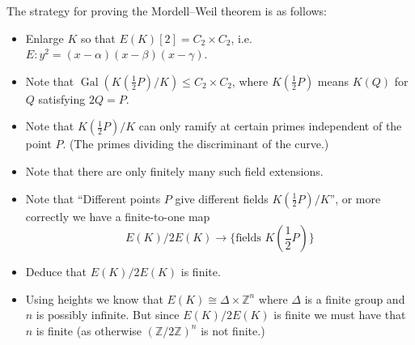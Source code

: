 \documentclass[a4paper]{article}
\theoremstyle{definition}
\DeclareMathOperator{\Gal}{Gal}
\newcommand{\Z}{\mathbb{Z}}
\begin{document}
The strategy for proving the Mordell--Weil theorem is as follows:
\begin{itemize}
    \item Enlarge $K$ so that $E(K)[2]=C_2\times C_2$, i.e.
        $E:y^2=(x-\alpha)(x-\beta)(x-\gamma)$.

    \item Note that $\Gal(K(\frac{1}{2}P)/K)\le C_2\times C_2$, where
        $K(\frac{1}{2}P)$ means $K(Q)$ for $Q$ satisfying $2Q=P$.

    \item Note that $K(\frac{1}{2}P)/K$ can only ramify at certain primes
        independent of the point $P$. (The primes dividing the discriminant of
        the curve.)

    \item Note that there are only finitely many such field extensions.

    \item Note that ``Different points $P$ give different fields
        $K(\frac{1}{2}P)/K$'', or more correctly we have a finite-to-one map
        \begin{equation*}
            E(K)/2E(K) \to \{\text{fields $K(\textstyle\frac{1}{2}P)$}\}
        \end{equation*}

    \item Deduce that $E(K)/2E(K)$ is finite.

    \item Using heights we know that $E(K)\cong\Delta\times\Z^n$ where $\Delta$
        is a finite group and $n$ is possibly infinite. But since $E(K)/2E(K)$
        is finite we must have that $n$ is finite (as otherwise $(\Z/2\Z)^n$ is
        not finite.)
\end{itemize}
\end{document}
